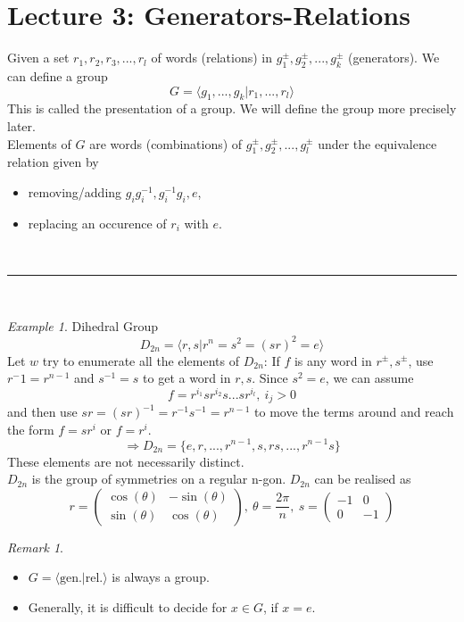 \documentclass{article}
\theoremstyle{definition}
\theoremstyle{remark}
\newtheorem*{remark}{Remark}
\newtheorem*{example}{Example}
\begin{document}
\section{Lecture 3: Generators-Relations}
Given a set $r_1,r_2,r_3,...,r_l$ of words (relations) in $g_1^{\pm},g_2^{\pm},...,g_k^{\pm}$ (generators). We can define a group
\begin{equation}
	G=\langle g_1,...,g_k|r_1,...,r_l\rangle
\end{equation}
This is called the presentation of a group. We will define the group more precisely later.\\
\indent Elements of $G$ are words (combinations) of $g_1^{\pm},g_2^{\pm},...,g_l^{\pm}$ under the equivalence relation given by
\begin{itemize}
	\item removing/adding $g_ig_i^{-1}, g_i^{-1}g_i,e$,
	\item replacing an occurence of $r_i$ with $e$.
\end{itemize}
\vspace{2mm}~\\
\hrule
\vspace{2mm}~\\
\begin{example} Dihedral Group
	\begin{equation}
		D_{2n}=\langle r,s|r^n=s^2=(sr)^2=e\rangle
	\end{equation}
	Let $w$ try to enumerate all the elements of $D_{2n}$:
	If $f$ is any word in $r^{\pm},s^{\pm}$, use $r^-1=r^{n-1}$ and $s^{-1}=s$ to get a word in $r,s$. Since $s^2=e$, we can assume
	\begin{equation}
		f=r^{i_1}sr^{i_2}s...sr^{i_l},~i_j>0
	\end{equation}
	and then use $sr=(sr)^{-1}=r^{-1}s^{-1}=r^{n-1}$ to move the terms around and reach the form $f=sr^i$ or $f=r^i$.\\
	\begin{equation}
		\Rightarrow D_{2n}=\lbrace e,r,...,r^{n-1},s,rs,...,r^{n-1}s\rbrace
	\end{equation}
	These elements are not necessarily distinct.\\
	\indent $D_{2n}$ is the group of symmetries on a regular n-gon. $D_{2n}$ can be realised as
	\begin{equation}
		r=
		\begin{pmatrix}
			\cos(\theta) & -\sin(\theta) \\
			\sin(\theta) & \cos(\theta)
		\end{pmatrix}
		,~\theta = \frac{2\pi}{n},~s=
		\begin{pmatrix}
			-1 & 0  \\
			0  & -1
		\end{pmatrix}
	\end{equation}
\end{example}
\begin{remark}~
	\begin{itemize}
		\item $G=\langle \text{gen.}|\text{rel.}\rangle$ is always a group.
		\item Generally, it is difficult to decide for $x\in G$, if $x=e$.
	\end{itemize}
\end{remark}
\newpage
\end{document}
